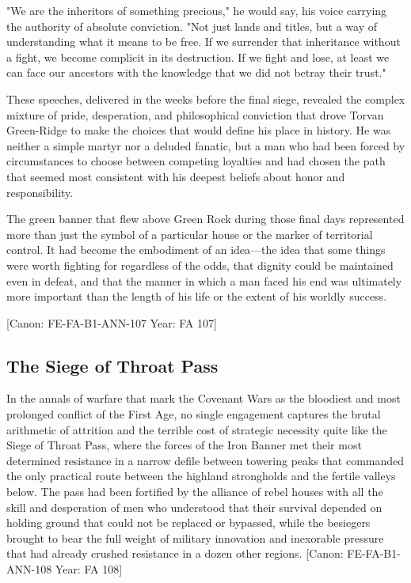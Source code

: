 "We are the inheritors of something precious," he would say, his voice
carrying the authority of absolute conviction. "Not just lands and
titles, but a way of understanding what it means to be free. If we
surrender that inheritance without a fight, we become complicit in its
destruction. If we fight and lose, at least we can face our ancestors
with the knowledge that we did not betray their trust."

These speeches, delivered in the weeks before the final siege, revealed
the complex mixture of pride, desperation, and philosophical conviction
that drove Torvan Green-Ridge to make the choices that would define his
place in history. He was neither a simple martyr nor a deluded fanatic,
but a man who had been forced by circumstances to choose between
competing loyalties and had chosen the path that seemed most consistent
with his deepest beliefs about honor and responsibility.

The green banner that flew above Green Rock during those final days
represented more than just the symbol of a particular house or the
marker of territorial control. It had become the embodiment of an
idea---the idea that some things were worth fighting for regardless of
the odds, that dignity could be maintained even in defeat, and that the
manner in which a man faced his end was ultimately more important than
the length of his life or the extent of his worldly success.

{[}Canon: FE-FA-B1-ANN-107 \textbar{} Year: FA 107{]}

\subsection{The Siege of Throat Pass}\label{the-siege-of-throat-pass}

In the annals of warfare that mark the Covenant Wars as the bloodiest
and most prolonged conflict of the First Age, no single engagement
captures the brutal arithmetic of attrition and the terrible cost of
strategic necessity quite like the Siege of Throat Pass, where the
forces of the Iron Banner met their most determined resistance in a
narrow defile between towering peaks that commanded the only practical
route between the highland strongholds and the fertile valleys below.
The pass had been fortified by the alliance of rebel houses with all the
skill and desperation of men who understood that their survival depended
on holding ground that could not be replaced or bypassed, while the
besiegers brought to bear the full weight of military innovation and
inexorable pressure that had already crushed resistance in a dozen other
regions. {[}Canon: FE-FA-B1-ANN-108 \textbar{} Year: FA 108{]}

